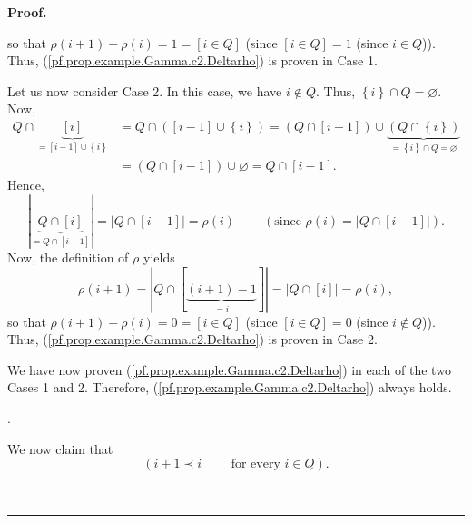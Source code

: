 \documentclass[numbers=enddot,12pt,final,onecolumn,notitlepage,abstracton]{scrartcl}
\theoremstyle{definition}
\newenvironment{proof}[1][Proof]{\noindent\textbf{#1.} }{\ \rule{0.5em}{0.5em}}
\newenvironment{verlong}{}{}
\begin{document}
\begin{verlong}
\begin{footnotesize}
\begin{proof}
{\[\]
so that $\rho\left(  i+1\right)  -\rho\left(  i\right)  =1=\left[  i\in
Q\right]  $ (since $\left[  i\in Q\right]  =1$ (since $i\in Q$)). Thus,
(\ref{pf.prop.example.Gamma.c2.Deltarho}) is proven in Case 1.
\par
Let us now consider Case 2. In this case, we have $i\notin Q$. Thus, $\left\{
i\right\}  \cap Q=\varnothing$. Now,
\begin{align*}
Q\cap\underbrace{\left[  i\right]  }_{=\left[  i-1\right]  \cup\left\{
i\right\}  }  &  =Q\cap\left(  \left[  i-1\right]  \cup\left\{  i\right\}
\right)  =\left(  Q\cap\left[  i-1\right]  \right)  \cup\underbrace{\left(
Q\cap\left\{  i\right\}  \right)  }_{=\left\{  i\right\}  \cap Q=\varnothing
}\\
&  =\left(  Q\cap\left[  i-1\right]  \right)  \cup\varnothing=Q\cap\left[
i-1\right]  .
\end{align*}
Hence,%
\[
\left\vert \underbrace{Q\cap\left[  i\right]  }_{=Q\cap\left[  i-1\right]
}\right\vert =\left\vert Q\cap\left[  i-1\right]  \right\vert =\rho\left(
i\right)  \ \ \ \ \ \ \ \ \ \ \left(  \text{since }\rho\left(  i\right)
=\left\vert Q\cap\left[  i-1\right]  \right\vert \right)  .
\]
Now, the definition of $\rho$ yields%
\[
\rho\left(  i+1\right)  =\left\vert Q\cap\left[  \underbrace{\left(
i+1\right)  -1}_{=i}\right]  \right\vert =\left\vert Q\cap\left[  i\right]
\right\vert =\rho\left(  i\right)  ,
\]
so that $\rho\left(  i+1\right)  -\rho\left(  i\right)  =0=\left[  i\in
Q\right]  $ (since $\left[  i\in Q\right]  =0$ (since $i\notin Q$)). Thus,
(\ref{pf.prop.example.Gamma.c2.Deltarho}) is proven in Case 2.
\par
We have now proven (\ref{pf.prop.example.Gamma.c2.Deltarho}) in each of the
two Cases 1 and 2. Therefore, (\ref{pf.prop.example.Gamma.c2.Deltarho}) always
holds.}.

We now claim that%
\begin{equation}
\left(  i+1\prec i\qquad\text{ for every }i\in Q\right)  .
\label{pf.prop.example.Gamma.c2.part1}%
\end{equation}



\end{proof}
\end{footnotesize}
\end{verlong}
\end{document}
